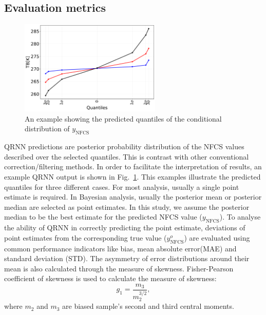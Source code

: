 \documentclass[amt, manuscript]{copernicus}
\newcommand{\ynfcs}{y_\text{NFCS}}
\newcommand{\yonfcs}{y^{o}_\text{NFCS}}
\begin{document}
\subsection{Evaluation metrics}
\label{sec:validation}
\begin{figure}[t]
	\centering
	\includegraphics[height=45mm]{Figures/posterior_distribution_I1V.pdf} 
	\caption{An example showing the predicted quantiles of the conditional distribution of $\ynfcs$ }
	\label{fig:posterior_distribution_I1V}	
\end{figure}
QRNN predictions are posterior probability distribution of the NFCS values described over the selected quantiles. This is contrast with other conventional correction/filtering methods. In order to facilitate the interpretation of results, an example QRNN output is shown in Fig.~\ref{fig:posterior_distribution_I1V}. This examples illustrate the predicted quantiles for three different cases. For most analysis, usually a single point estimate is required. In Bayesian analysis, usually the posterior mean or posterior median are selected as point estimates. In this study, we assume the posterior median to be the best estimate for the predicted NFCS value ($\ynfcs$). To analyse the ability of QRNN in correctly predicting the point estimate, deviations of point estimates from the corresponding true value ($\yonfcs$) are evaluated using common performance indicators like bias, mean absolute error(MAE) and standard deviation (STD). The asymmetry of error distributions around their mean is also calculated through the measure of skewness. Fisher-Pearson coefficient of skewness is used to calculate the measure of skewness: 
\begin{equation}
g_1 = \frac{m_3}{m_2^{3/2}}, 
\end{equation}
where $m_2$ and $m_3$ are biased sample's second and third central moments.
\end{document}
